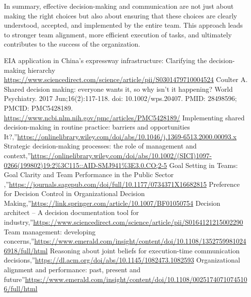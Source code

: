 \documentclass[12pt]{article}
\begin{document}
In summary, effective decision-making and communication are not just about making the right choices but also about ensuring that these choices are clearly understood, accepted, and implemented by the entire team. This approach leads to stronger team alignment, more efficient execution of tasks, and ultimately contributes to the success of the organization.



\begin{thebibliography}{8}
    EIA application in China’s expressway infrastructure: Clarifying the decision-making hierarchy \url{https://www.sciencedirect.com/science/article/pii/S0301479710004524}
    Coulter A. Shared decision making: everyone wants it, so why isn't it happening? World Psychiatry. 2017 Jun;16(2):117-118. doi: 10.1002/wps.20407. PMID: 28498596; PMCID: PMC5428189. \url{https://www.ncbi.nlm.nih.gov/pmc/articles/PMC5428189/} 
    Implementing shared decision-making in routine practice: barriers and opportunities It?,”\url{https://onlinelibrary.wiley.com/doi/abs/10.1046/j.1369-6513.2000.00093.x}
    Strategic decision-making processes: the role of management and context,”\url{https://onlinelibrary.wiley.com/doi/abs/10.1002/(SICI)1097-0266(199802)19:2%3C115::AID-SMJ941%3E3.0.CO;2-5}
    Goal Setting in Teams: Goal Clarity and Team Performance in the Public Sector
    ,”\url{https://journals.sagepub.com/doi/full/10.1177/0734371X16682815}
    Preference for Decision Control in Organizational Decision Making,”\url{https://link.springer.com/article/10.1007/BF01050754}
    Decision architect – A decision documentation tool for industry,”\url{https://www.sciencedirect.com/science/article/pii/S0164121215002290}
    Team management: developing concerns,”\url{https://www.emerald.com/insight/content/doi/10.1108/13527599810246918/full/html}
    Reasoning about joint beliefs for execution-time communication decisions,”\url{https://dl.acm.org/doi/abs/10.1145/1082473.1082593}
    Organizational alignment and performance: past, present and future”\url{https://www.emerald.com/insight/content/doi/10.1108/00251740710745106/full/html}
\end{thebibliography}
\end{document}
